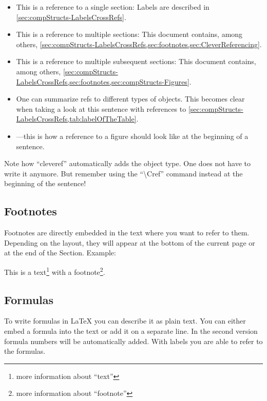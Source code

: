 \begin{itemize}
  \item This is a reference to a single section: Labels are described
in \cref{sec:compStructs-LabelsCrossRefs}.
  \item This is a reference to multiple sections: This document
contains, among others,
\cref{sec:compStructs-LabelsCrossRefs,sec:footnotes,sec:CleverReferencing}.
  \item This is a reference to multiple subsequent sections: This
document contains, among others,
\cref{sec:compStructs-LabelsCrossRefs,sec:footnotes,sec:compStructs-Figures}.
  \item One can summarize refs to different types of objects. This
becomes clear when taking a look at this sentence with references to
\cref{sec:compStructs-LabelsCrossRefs,tab:labelOfTheTable}.
  \item {}---this is how a reference to a figure
    should look like at the beginning of a sentence.
\end{itemize}

Note how ``cleveref'' automatically adds the object type. One does not
have to write it anymore.
But remember using the ``\textbackslash{}Cref'' command instead
at the beginning of the sentence!

\subsection{Footnotes}\label{sec:footnotes}

Footnotes are directly embedded in the text where you want to refer to
them.
Depending on the layout, they will appear at the bottom of the current
page or
at the end of the Section. Example:

This is a text\footnote{more information about ``text''} with a
footnote\footnote{more information about ``footnote''}.


\subsection{Formulas}

To write formulas in \LaTeX{} you can describe it as plain text.
You can either embed a formula into the text or add it on a separate
line.
In the second version formula numbers will be automatically added.
With labels you are able to refer to the formulas.

